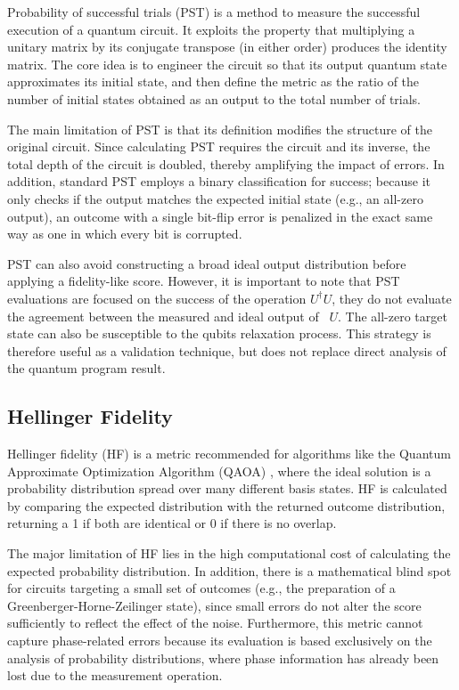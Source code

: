 \documentclass[pdflatex,sn-mathphys-num]{sn-jnl}
\theoremstyle{thmstyleone}%
\theoremstyle{thmstyletwo}%
\theoremstyle{thmstylethree}%
\begin{document}
Probability of successful trials (PST) \cite{mohapatraBenchmarkingFidelityMetrics_2025} is a method to measure the successful execution of a quantum circuit. It exploits the property that multiplying a unitary matrix by its conjugate transpose (in either order) produces the identity matrix. The core idea is to engineer the circuit so that its output quantum state approximates its initial state, and then define the metric as the ratio of the number of initial states obtained as an output to the total number of trials.

The main limitation of PST is that its definition modifies the structure of the original circuit. Since calculating PST requires the circuit and its inverse, the total depth of the circuit is doubled, thereby amplifying the impact of errors. In addition, standard PST employs a binary classification for success; because it only checks if the output matches the expected initial state (e.g., an all-zero output), an outcome with a single bit-flip error is penalized in the exact same way as one in which every bit is corrupted.

PST can also avoid constructing a broad ideal output distribution before applying a fidelity-like score. However, it is important to note that PST evaluations are focused on the success of the operation $U^{\dagger}U$, they do not evaluate the agreement between the measured and ideal output of ~$U$. The all-zero target state can also be susceptible to the qubits relaxation process. This strategy is therefore useful as a validation technique, but does not replace direct analysis of the quantum program result.

\subsection{Hellinger Fidelity}\label{sec:hellinger-fidelity}

Hellinger fidelity (HF) is a metric recommended for algorithms like the Quantum Approximate Optimization Algorithm (QAOA) \cite{zhouQuantumApproximateOptimization_2020}, where the ideal solution is a probability distribution spread over many different basis states. HF is calculated by comparing the expected distribution with the returned outcome distribution, returning a 1 if both are identical or 0 if there is no overlap.

The major limitation of HF \cite{mohapatraBenchmarkingFidelityMetrics_2025} lies in the high computational cost of calculating the expected probability distribution. In addition, there is a mathematical blind spot for circuits targeting a small set of outcomes (e.g., the preparation of a Greenberger-Horne-Zeilinger state), since small errors do not alter the score sufficiently to reflect the effect of the noise. Furthermore, this metric cannot capture phase-related errors because its evaluation is based exclusively on the analysis of probability distributions, where phase information has already been lost due to the measurement operation.
\end{document}
